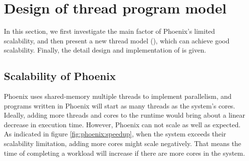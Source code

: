\section{Design of thread program model}
In this section, we first investigate the main factor of Phoenix's limited scalability, 
and then present a new thread model (\myth), which can achieve good scalability.
Finally, the detail design and implementation of \myth is given.


\subsection{Scalability of Phoenix}
Phoenix uses shared-memory multiple threads to implement parallelism,
and programs written in Phoenix will start as many threads as the system's cores.
Ideally, adding more threads and cores to the runtime would bring about a linear decrease in execution time.
However, Phoenix can not scale as well as expected.
As indicated in figure \ref{fig:phoenix:speedup}, 
when the system exceeds their scalability limitation, 
adding more cores might scale negatively.
That means the time of completing a workload will increase if there are more cores in the system. 


